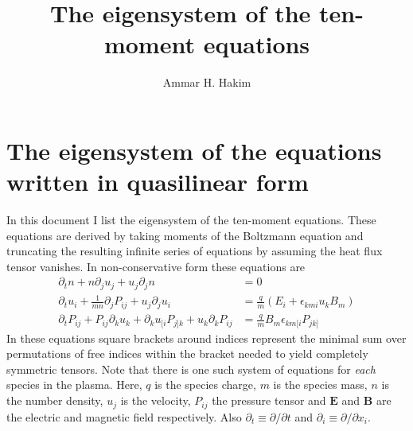 \documentclass[11pt, reqno]{amsart}
\title[Tenmoment Eigensystem]{The eigensystem of the ten-moment
  equations}%
\author{Ammar H. Hakim}%
\date{}
\theoremstyle{definition}
\begin{document}
\maketitle

\section{The eigensystem of the equations written in quasilinear form}

In this document I list the eigensystem of the ten-moment
equations. These equations are derived by taking moments of the
Boltzmann equation and truncating the resulting infinite series of
equations by assuming the heat flux tensor vanishes. In
non-conservative form these equations are
\begin{align}
  \partial_t{n} + n \partial_j{u_j} + u_j \partial_j{n} &= 0 \label{eq:n} \\
  \partial_t{u_i}
  + \frac{1}{mn}\partial_j{P_{ij}}
  + u_j \partial_j{u_i} &=
  \frac{q}{m}\left(E_i + \epsilon_{kmi}u_kB_m\right) \label{eq:ui} \\
  \partial_t{P_{ij}} + P_{ij}\partial_k{u_k}
  + \partial_k{u_{[i}}P_{j]k}
  + u_k\partial_k{P_{ij}}
  &= \frac{q}{m}B_m \epsilon_{km[i}P_{jk]} \label{eq:Pij}
\end{align}
In these equations square brackets around indices represent the
minimal sum over permutations of free indices within the bracket
needed to yield completely symmetric tensors. Note that there is one
such system of equations for \emph{each} species in the plasma. Here,
$q$ is the species charge, $m$ is the species mass, $n$ is the number
density, $u_j$ is the velocity, $P_{ij}$ the pressure tensor and
$\mathbf{E}$ and $\mathbf{B}$ are the electric and magnetic field
respectively. Also $\partial_t \equiv \partial /\partial t$ and
$\partial_i \equiv \partial /\partial x_i$.
\end{document}
